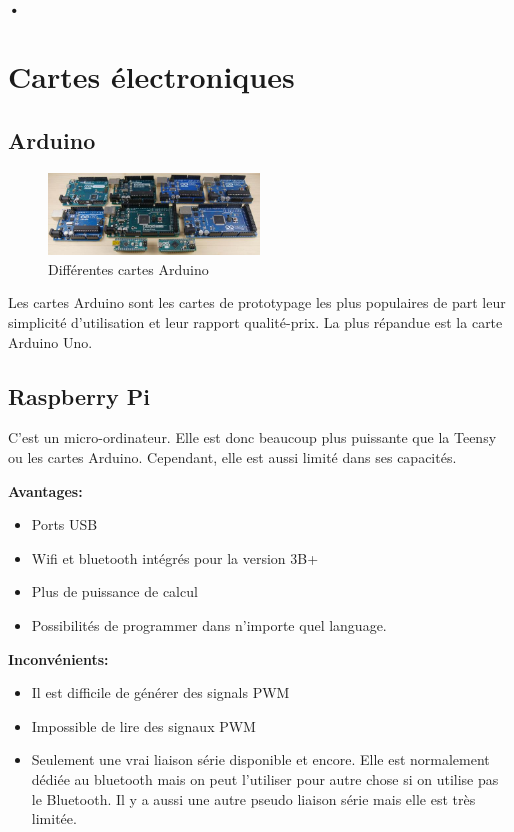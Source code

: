 \documentclass[a4paper, 11pt]{report}
\begin{document}
\subsubsection{•}

\chapter{Cartes électroniques}

\section{Arduino}

\begin{figure}[h!]
\begin{centering}
\includegraphics[width=0.5\textwidth]{images/cartesArduino.jpg}
\caption{Différentes cartes Arduino}
\par\end{centering}
\end{figure}

Les cartes Arduino sont les cartes de prototypage les plus populaires de part leur simplicité d'utilisation et leur rapport qualité-prix. La plus répandue est la carte Arduino Uno.

\section{Raspberry Pi}
C'est un micro-ordinateur. Elle est donc beaucoup plus puissante que la Teensy ou les cartes Arduino. Cependant, elle est aussi limité dans ses capacités.

\textbf{Avantages:}
\begin{itemize}
\item Ports USB
\item Wifi et bluetooth intégrés pour la version 3B+
\item Plus de puissance de calcul
\item Possibilités de programmer dans n'importe quel language.
\end{itemize}

\textbf{Inconvénients:}
\begin{itemize}
\item Il est difficile de générer des signals PWM
\item Impossible de lire des signaux PWM
\item Seulement une vrai liaison série disponible et encore. Elle est normalement dédiée au bluetooth mais on peut l'utiliser pour autre chose si on utilise pas le Bluetooth. Il y a aussi une autre pseudo liaison série mais elle est très limitée.
\end{itemize}
\end{document}
